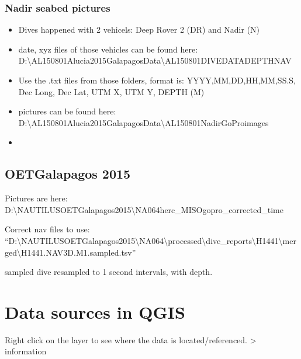 \documentclass[letterpaper,10pt,english]{sphinxmanual}
\begin{document}
\subsubsection{Nadir seabed pictures}
\label{\detokenize{02_folder_hierarchy:nadir-seabed-pictures}}\begin{itemize}
\item {} 
\sphinxAtStartPar
Dives happened with 2 vehicels: Deep Rover 2 (DR)  and Nadir (N)

\item {} 
\sphinxAtStartPar
date, xyz files of those vehicles can be found here: D:\textbackslash{}AL150801\sphinxhyphen{}Alucia\sphinxhyphen{}2015\sphinxhyphen{}Galapagos\sphinxhyphen{}Data\textbackslash{}AL150801\sphinxhyphen{}DIVE\sphinxhyphen{}DATA\sphinxhyphen{}DEPTH\sphinxhyphen{}NAV

\item {} 
\sphinxAtStartPar
Use the .txt files from those folders, format is: YYYY,MM,DD,HH,MM,SS.S, Dec Long,  Dec Lat,  UTM X,  UTM Y,  \sphinxhyphen{}DEPTH (M)

\item {} 
\sphinxAtStartPar
pictures can be found here: D:\textbackslash{}AL150801\sphinxhyphen{}Alucia\sphinxhyphen{}2015\sphinxhyphen{}Galapagos\sphinxhyphen{}Data\textbackslash{}AL150801\sphinxhyphen{}Nadir\sphinxhyphen{}GoPro\sphinxhyphen{}images

\item {} 
\end{itemize}


\subsection{OET\sphinxhyphen{}Galapagos 2015}
\label{\detokenize{02_folder_hierarchy:oet-galapagos-2015}}
\sphinxAtStartPar
Pictures are here: D:\textbackslash{}NAUTILUS\sphinxhyphen{}OET\sphinxhyphen{}Galapagos\sphinxhyphen{}2015\textbackslash{}NA064\sphinxhyphen{}herc\_MISO\sphinxhyphen{}gopro\_corrected\_time

\sphinxAtStartPar
Correct nav files to use: “D:\textbackslash{}NAUTILUS\sphinxhyphen{}OET\sphinxhyphen{}Galapagos\sphinxhyphen{}2015\textbackslash{}NA064\textbackslash{}processed\textbackslash{}dive\_reports\textbackslash{}H1441\textbackslash{}merged\textbackslash{}H1441.NAV3D.M1.sampled.tsv”

\sphinxAtStartPar
sampled  dive resampled to 1 second intervals, with depth.


\section{Data sources in QGIS}
\label{\detokenize{02_folder_hierarchy:data-sources-in-qgis}}
\sphinxAtStartPar
Right click on the layer to see where the data is located/referenced. \sphinxhyphen{}\textgreater{} information
\end{document}
